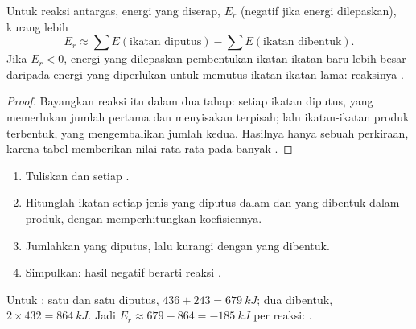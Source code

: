 \begin{proposition}\label{prop:g11:reaction-energy:estimate}
Untuk reaksi antargas, energi yang diserap, $E_r$ (negatif jika energi
dilepaskan), kurang lebih
\[
  E_r \approx \sum E(\text{ikatan diputus}) - \sum E(\text{ikatan dibentuk}) .
\]
Jika $E_r < 0$, energi yang dilepaskan pembentukan ikatan-ikatan baru
lebih besar daripada energi yang diperlukan untuk memutus ikatan-ikatan
lama: reaksinya .
\end{proposition}

\begin{proof}
Bayangkan reaksi itu dalam dua tahap: setiap ikatan  diputus,
yang memerlukan jumlah pertama dan menyisakan  terpisah; lalu
ikatan-ikatan produk terbentuk, yang mengembalikan jumlah kedua.
Hasilnya hanya sebuah perkiraan, karena tabel memberikan nilai rata-rata
pada banyak .
\end{proof}

\begin{method}\label{met:g11:reaction-energy:bonds}
\begin{enumerate}
  \item Tuliskan  dan  setiap .
  \item Hitunglah ikatan setiap jenis yang diputus dalam  dan
        yang dibentuk dalam produk, dengan memperhitungkan koefisiennya.
  \item Jumlahkan  yang diputus, lalu kurangi dengan  yang dibentuk.
  \item Simpulkan: hasil negatif berarti reaksi .
\end{enumerate}
\end{method}

\begin{example}\label{ex:g11:reaction-energy:hcl}
Untuk : satu  dan satu  diputus,
$436 + 243 = \qty{679}{kJ}$; dua  dibentuk, $2 \times 432 =
\qty{864}{kJ}$. Jadi $E_r \approx 679 - 864 = \qty{-185}{kJ}$ per 
reaksi: .
\end{example}



